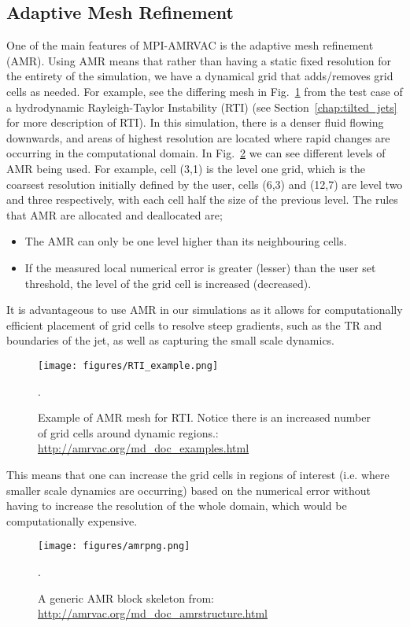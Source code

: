 \subsection{Adaptive Mesh Refinement}
\label{ssec:amr}
One of the main features of MPI-AMRVAC is the adaptive mesh refinement (AMR). Using AMR means that rather than having a static fixed resolution for the entirety of the simulation, we have a dynamical grid that adds/removes grid cells as needed. For example, see the differing mesh in Fig.~\ref{amr_example} from the test case of a hydrodynamic Rayleigh-Taylor Instability (RTI) (see Section~\ref{chap:tilted_jets} for more description of RTI). In this simulation, there is a denser fluid flowing downwards, and areas of highest resolution are located where rapid changes are occurring in the computational domain. In Fig.~\ref{amr_scheme} we can see different levels of AMR being used. For example, cell (3,1) is the level one grid, which is the coarsest resolution initially defined by the user, cells (6,3) and (12,7) are level two and three respectively, with each cell half the size of the previous level. The rules that AMR are allocated and deallocated are;
\begin{itemize}
    \item The AMR can only be one level higher than its neighbouring cells.
    \item If the measured local numerical error is greater (lesser) than the user set threshold, the level of the grid cell is increased (decreased).
\end{itemize}
It is advantageous to use AMR in our simulations as it allows for computationally efficient placement of grid cells to resolve steep gradients, such as the TR and boundaries of the jet, as well as capturing the small scale dynamics.  
\begin{figure}
\centering
\texttt{[image: figures/RTI\_example.png]}
\caption{Example of AMR mesh for RTI. Notice there is an increased number of grid cells around dynamic regions.: \url{http://amrvac.org/md_doc_examples.html}}.
\label{amr_example}
\end{figure}   
This means that one can increase the grid cells in regions of interest (i.e. where smaller scale dynamics are occurring) based on the numerical error without having to increase the resolution of the whole domain, which would be computationally expensive.
\begin{figure}
\centering
\texttt{[image: figures/amrpng.png]}
\caption{A generic AMR block skeleton from: \url{http://amrvac.org/md_doc_amrstructure.html}}.
\label{amr_scheme}
\end{figure}   
